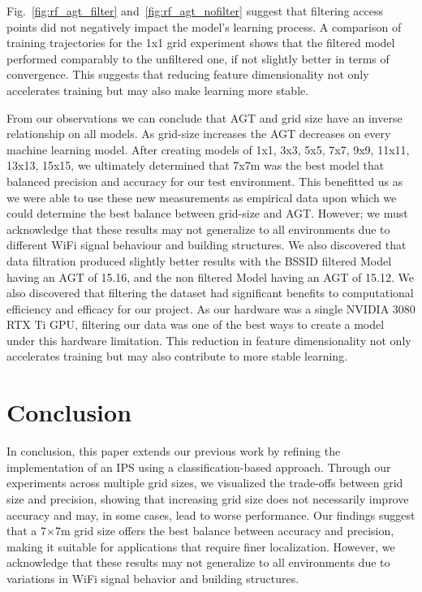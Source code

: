 \documentclass[runningheads]{llncs}
\begin{document}
Fig.~\ref{fig:rf_agt_filter} and~\ref{fig:rf_agt_nofilter} suggest that filtering access points did not negatively impact the model's learning process. A comparison of training trajectories for the 1x1 grid experiment shows that the filtered model performed comparably to the unfiltered one, if not slightly better in terms of convergence. This suggests that reducing feature dimensionality not only accelerates training but may also make learning more stable.

From our observations we can conclude that AGT and grid size have an inverse relationship on all models. As grid-size increases the AGT decreases on every machine learning model. After creating models of 1x1, 3x3, 5x5, 7x7, 9x9, 11x11, 13x13, 15x15, we ultimately determined that 7x7m was the best model that balanced precision and accuracy for our test environment. This benefitted us as we were able to use these new measurements as empirical data upon which we could determine the best balance between grid-size and AGT. However; we must acknowledge that these results may not generalize to all environments due to different WiFi signal behaviour and building structures. We also discovered that data filtration produced slightly better results with the BSSID filtered Model having an AGT of 15.16, and the non filtered Model having an AGT of 15.12. We also discovered that filtering the dataset had significant benefits to computational efficiency and efficacy for our project. As our hardware was a single NVIDIA 3080 RTX Ti GPU, filtering our data was one of the best ways to create a model under this hardware limitation. This reduction in feature dimensionality not only accelerates training but may also contribute to more stable learning.





\section{Conclusion}
\vspace{-10pt}
In conclusion, this paper extends our previous work by refining the implementation of an IPS using a classification-based approach. Through our experiments across multiple grid sizes, we visualized the trade-offs between grid size and precision, showing that increasing grid size does not necessarily improve accuracy and may, in some cases, lead to worse performance. Our findings suggest that a 7×7m grid size offers the best balance between accuracy and precision, making it suitable for applications that require finer localization. However, we acknowledge that these results may not generalize to all environments due to variations in WiFi signal behavior and building structures.
\end{document}
